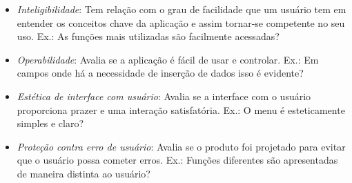 \begin{itemize}
    \begin{itemize}
        \item \textit{Inteligibilidade}: Tem relação com o grau de facilidade que um usuário tem em entender os conceitos chave da aplicação e assim tornar-se competente no seu uso. Ex.: As funções mais utilizadas são facilmente acessadas?
        \item \textit{Operabilidade}: Avalia se a aplicação é fácil de usar e controlar. Ex.: Em campos onde há a necessidade de inserção de dados isso é evidente?
        \item \textit{Estética de interface com usuário}: Avalia se a interface com o usuário proporciona prazer e uma interação satisfatória. Ex.: O menu é esteticamente simples e claro?
        \item \textit{Proteção contra erro de usuário}: Avalia se o produto foi projetado para evitar que o usuário possa cometer erros. Ex.: Funções diferentes são apresentadas de maneira distinta ao usuário?
    \end{itemize}
\end{itemize}
